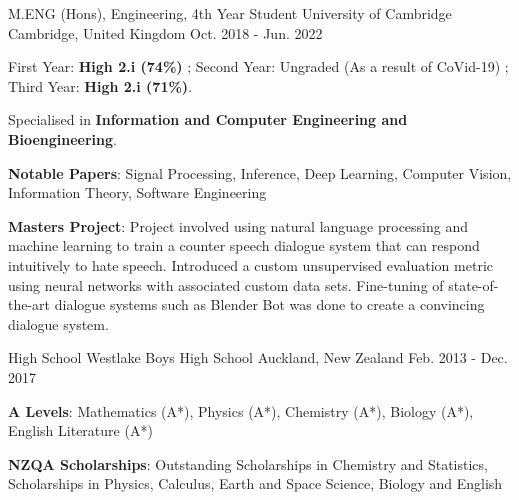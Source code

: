 

\begin{cventries}

  \cventry
    {M.ENG (Hons), Engineering, 4th Year Student} %
    {University of Cambridge} %
    {Cambridge, United Kingdom} %
    {Oct. 2018 - Jun. 2022} %
    {
      \begin{cvitems} %
        \item {First Year: \textbf{High 2.i (74\%)} ; Second Year: Ungraded (As a result of CoVid-19) ; Third Year: \textbf{High 2.i (71\%)}.}
        \item {Specialised in \textbf{Information and Computer Engineering and Bioengineering}.}
        \item {\textbf{Notable Papers}: Signal Processing, Inference, Deep Learning, Computer Vision, Information Theory, Software Engineering}
        \item {\textbf{Masters Project}: Project involved using natural language processing and machine learning to train a counter speech dialogue system that can respond intuitively to hate speech. Introduced a custom unsupervised evaluation metric using neural networks with associated custom data sets. Fine-tuning of state-of-the-art dialogue systems such as Blender Bot was done to create a convincing dialogue system.}
      \end{cvitems}
    }

  \cventry
    {High School} %
    {Westlake Boys High School} %
    {Auckland, New Zealand} %
    {Feb. 2013 - Dec. 2017} %
    {
      \begin{cvitems}
        \item {\textbf{A Levels}: Mathematics (A*), Physics (A*), Chemistry (A*), Biology (A*), English Literature (A*)}
        \item {\textbf{NZQA Scholarships}: Outstanding Scholarships in Chemistry and Statistics, Scholarships in Physics, Calculus, Earth and Space Science, Biology and English}
      \end{cvitems}
    }


\end{cventries}
